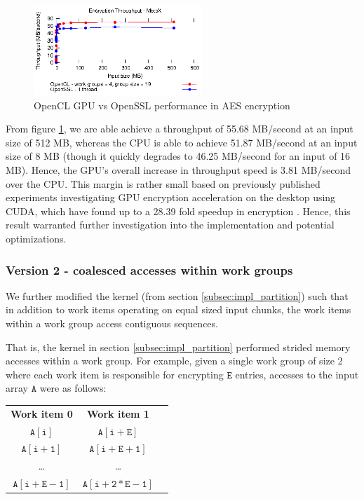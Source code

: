 \documentclass[conference,10pt]{IEEEtran}
\begin{document}
\begin{figure}[!t]
\centering
\includegraphics[width=2.5in]{../final/motox/4.2/opencl_sizes_vs_cpu_sizes.opencl_4G_19L.cpu_1thread.report.eps}
\caption{OpenCL GPU vs OpenSSL performance in AES encryption}
\label{fig:opencl_vs_cpu}
\end{figure}

From figure \ref{fig:opencl_vs_cpu}, we are able achieve a throughput of 55.68 MB/second at an input 
size of 512 MB, whereas the CPU is able to achieve 51.87 MB/second at an input size of 8 MB (though 
it quickly degrades to 46.25 MB/second for an input of 16 MB).  Hence, the GPU's overall increase in 
throughput speed is 3.81 MB/second over the CPU.  This margin is rather small based on previously 
published experiments investigating GPU encryption acceleration on the desktop using CUDA, which 
have found up to a 28.39 fold speedup in encryption \cite{aes_cuda}.  Hence, this result warranted 
further investigation into the implementation and potential optimizations.

\subsubsection{Version 2 - coalesced accesses within work groups}
\label{subsec:impl_coalesce}

We further modified the kernel (from section \ref{subsec:impl_partition}) such that in addition to 
work items operating on equal sized input chunks, the work items within a work group access 
contiguous sequences.  

That is, the kernel in section \ref{subsec:impl_partition} performed strided memory accesses 
\cite{gpu_mem} within a work group.  For example, given a single work group of size 2 where each 
work item is responsible for encrypting $\mathtt{E}$ entries, accesses to the input array 
$\mathtt{A}$ were as follows:

\begin{table}[h]
\centering
\begin{tabular}{ccc}
    \textbf{Work item 0} & \textbf{Work item 1} \\
    $\mathtt{A[i]}$         & $\mathtt{A[i + E]}$ \\
    $\mathtt{A[i + 1]}$     & $\mathtt{A[i + E + 1]}$ \\
    \ldots       & \ldots \\
    $\mathtt{A[i + E - 1]}$ & $\mathtt{A[i + 2*E - 1]}$ \\
\end{tabular}
\end{table}
\end{document}
